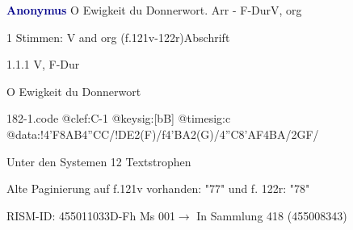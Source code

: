 \documentclass[twocolumn]{book}
\begin{document}
\par \vspace{7pt} \textcolor{darkblue}{\textbf{Anonymus  }}\hfillplus{\textbf{[182]}}\newline O Ewigkeit du Donnerwort. Arr - F-Dur\newline V, org
\par \begin{itshape}\end{itshape} 
\par \textcolor{darkblue}{}  1 Stimmen: V and org  (f.121v-122r)\newline Abschrift
\par 1.1.1  V, F-Dur\newline \begin{footnotesize} O Ewigkeit du Donnerwort \end{footnotesize}  
\begin{filecontents*}{182-1.code}
@clef:C-1
@keysig:[bB]
@timesig:c
@data:!4'F8AB4''CC/!DE2(F)/f4'BA2(G)/4''C8'AF4BA/2GF/
\end{filecontents*}
\newline
%
\par Unter den Systemen 12 Textstrophen
\par Alte Paginierung auf f.121v vorhanden: "77" und f. 122r: "78"
\par RISM-ID: 455011033\newline D-Fh  Ms 001\newline $\rightarrow$ In Sammlung 418 (455008343)
      
\end{document}
